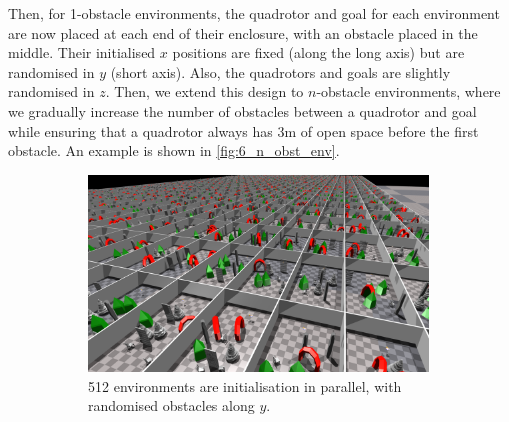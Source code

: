 Then, for 1-obstacle environments, the quadrotor and goal for each environment are now placed at each end of their enclosure, with an obstacle placed in the middle. Their initialised $x$ positions are fixed (along the long axis) but are randomised in $y$ (short axis). Also, the quadrotors and goals are slightly randomised in $z$. Then, we extend this design to $n$-obstacle environments, where we gradually increase the number of obstacles between a quadrotor and goal while ensuring that a quadrotor always has $3$m of open space before the first obstacle. An example is shown in \cref{fig:6_n_obst_env}.
\begin{figure}[hbt]
    \begin{subfigure}[b]{0.69\textwidth}
        \centering
        \includegraphics[width=0.99\textwidth]{figures/6_/6_environments.png}
        \caption{512 environments are initialisation in parallel, with randomised obstacles along $y$.\vspace{8mm}}
        \label{fig:6_environments}
    \end{subfigure}
    \hfill
    \begin{subfigure}[b]{0.3\textwidth}
        \centering

\end{subfigure}
\end{figure}
